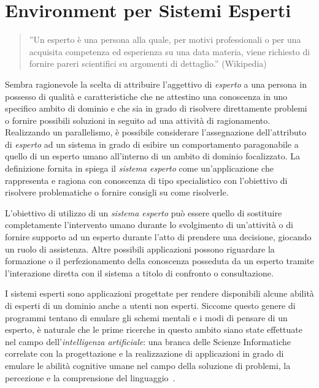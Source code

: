 \chapter{Environment per Sistemi Esperti}

\setcounter{section}{1}

\begin{quote}
''Un esperto è una persona alla quale, per motivi professionali o per una acquisita competenza ed esperienza su una data materia, viene richiesto di fornire pareri scientifici su argomenti di dettaglio.'' (Wikipedia)
\end{quote}

Sembra ragionevole la scelta di attribuire l'aggettivo di \emph{esperto} a una persona in possesso di qualità e caratteristiche che ne attestino una conoscenza in uno specifico ambito di dominio e che sia in grado di risolvere direttamente problemi o fornire possibili soluzioni in seguito ad una attività di ragionamento.
Realizzando un parallelismo, è possibile considerare l'assegnazione dell'attributo di \emph{esperto} ad un sistema in grado di esibire un comportamento paragonabile a quello di un esperto umano all'interno di un ambito di dominio focalizzato.
La definizione fornita in \cite{jackson1999} spiega il \emph{sistema esperto} come un'applicazione che rappresenta e ragiona con conoscenza di tipo specialistico con l'obiettivo di risolvere problematiche o fornire consigli su come risolverle.

L'obiettivo di utilizzo di un \emph{sistema esperto} può essere quello di sostituire completamente l'intervento umano durante lo svolgimento di un'attività o di fornire supporto ad un esperto durante l'atto di prendere una decisione, giocando un ruolo di assistenza. Altre possibili applicazioni possono riguardare la formazione o il perfezionamento della conoscenza posseduta da un esperto tramite l'interazione diretta con il sistema a titolo di confronto o consultazione.

I sistemi esperti sono applicazioni progettate per rendere disponibili alcune abilità di esperti di un dominio anche a utenti non esperti. Siccome questo genere di programmi tentano di emulare gli schemi mentali e i modi di pensare di un esperto, è naturale che le prime ricerche in questo ambito siano state effettuate nel campo dell'\emph{intelligenza artificiale}: una branca delle Scienze Informatiche correlate con la progettazione e la realizzazione di applicazioni in grado di emulare le abilità cognitive umane nel campo della soluzione di problemi, la percezione e la comprensione del linguaggio~\cite{feigenbaum1981ia}.

